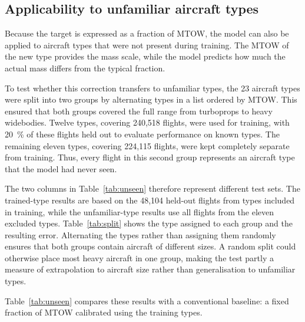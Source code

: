 \documentclass[
  manuscript=proceedings,  %
  layout=preprint,  %
  year=2026,
  volume=x,
]{extra/joas}
\begin{document}
\subsection{Applicability to unfamiliar aircraft types}
\label{sec:unseen}

Because the target is expressed as a fraction of MTOW, the model can also be applied to aircraft types that were not present during training. The MTOW of the new type provides the mass scale, while the model predicts how much the actual mass differs from the typical fraction.

To test whether this correction transfers to unfamiliar types, the 23 aircraft types were split into two groups by alternating types in a list ordered by MTOW. This ensured that both groups covered the full range from turboprops to heavy widebodies. Twelve types, covering 240{,}518 flights, were used for training, with 20~\% of these flights held out to evaluate performance on known types. The remaining eleven types, covering 224{,}115 flights, were kept completely separate from training. Thus, every flight in this second group represents an aircraft type that the model had never seen.

The two columns in Table~\ref{tab:unseen} therefore represent different test sets. The trained-type results are based on the 48{,}104 held-out flights from types included in training, while the unfamiliar-type results use all flights from the eleven excluded types. Table~\ref{tab:split} shows the type assigned to each group and the resulting error. Alternating the types rather than assigning them randomly ensures that both groups contain aircraft of different sizes. A random split could otherwise place most heavy aircraft in one group, making the test partly a measure of extrapolation to aircraft size rather than generalisation to unfamiliar types.

Table~\ref{tab:unseen} compares these results with a conventional baseline: a fixed fraction of MTOW calibrated using the training types.
\end{document}
